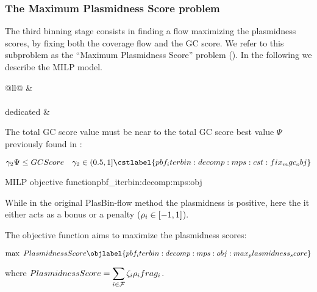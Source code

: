 \subsubsection{The Maximum Plasmidness Score problem \MPS{}}\label{sec:pbf_iterbin:decomp:mps}

The third binning stage consists in finding a flow maximizing the plasmidness scores, by fixing both the coverage flow and the GC score.
We refer to this subproblem as the \enquote{Maximum Plasmidness Score} problem (\MPS{}).
In the following we describe the MILP model.

\begin{table}[h!]
  \centering
  \label{tab:decomp:mps:cst}
  \begin{tabular}{@{}ll@{}}
    \toprule
     &  \\
    \midrule
     \\
    \addlinespace
    \MPS{} dedicated &  \\
    \bottomrule
  \end{tabular}
\end{table}

The total GC score value must be near to the total GC score best value \(\Psi{}\) previously found in \MGC{}:
\begin{Constraint}
  \begin{equation}
    \gamma_2 \Psi \leq GCScore \quad \gamma_2 \in (0.5, 1] %
    \cstlabel{pbf_iterbin:decomp:mps:cst:fix_mgc_obj} %
  \end{equation}
\end{Constraint}

\begin{definition}{\MPS{} MILP objective function}{pbf_iterbin:decomp:mps:obj}
  \begin{newfeatbox}
    While in the original PlasBin-flow method the plasmidness is positive, here the it either acts as a bonus or a penalty (\( \rho_{i} \in [-1, 1] \)).
  \end{newfeatbox}
  The objective function aims to maximize the plasmidness scores:
  \begin{Objective}
    \begin{equation}
      \max ~ PlasmidnessScore
      \objlabel{pbf_iterbin:decomp:mps:obj:max_plasmidness_score} %
    \end{equation}
  \end{Objective}
  where \(\displaystyle PlasmidnessScore = \sum_{i \in \mathcal{F}{}} \zeta_{i} \rho_{i} frag_{i}\).
\end{definition}

